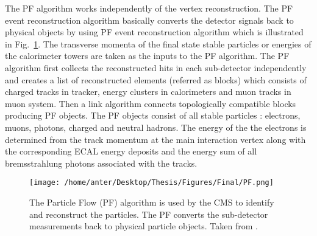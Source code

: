 The PF algorithm works independently of the vertex reconstruction. The PF event reconstruction algorithm basically converts the detector signals back to physical objects by using PF event reconstruction algorithm which is illustrated in Fig.~\ref{fig:PF_algo}. The transverse momenta of the final state stable particles or energies of the calorimeter towers are taken as the inputs to the PF algorithm. The PF algorithm first collects the reconstructed hits in each sub-detector independently and creates a list of reconstructed elements (referred as blocks) which consists of charged tracks in tracker, energy clusters in calorimeters and muon tracks in muon system. Then a link algorithm connects topologically compatible blocks producing PF objects. The PF objects consist of all stable particles : electrons, muons, photons, charged and neutral hadrons. The energy of the the electrons is determined from the track momentum at the main interaction vertex along with the corresponding ECAL energy deposits and the energy sum of all bremsstrahlung photons associated with the tracks. 
\begin{figure}[!t]
 \begin{center}
 \vspace*{4mm} 
 \texttt{[image: /home/anter/Desktop/Thesis/Figures/Final/PF.png]}
 \vspace*{5mm}
 \caption[The Particle Flow (PF) algorithm is used by the CMS to identify and reconstruct the particles. The PF converts the sub-detector measurements back to physical particle objects.]{The Particle Flow (PF) algorithm is used by the CMS to identify and reconstruct the particles. The PF converts the sub-detector measurements back to physical particle objects. Taken from \cite{Rabbertz:2017ssq}.}
 \label{fig:PF_algo}
 \end{center}
\end{figure}
